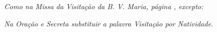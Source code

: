
\textit{Como na Missa da Visitação da B. V. Maria, página \pageref{visitacao}, excepto:}

\textit{Na Oração e Secreta substituir a palavra Visitação por Natividade.}



